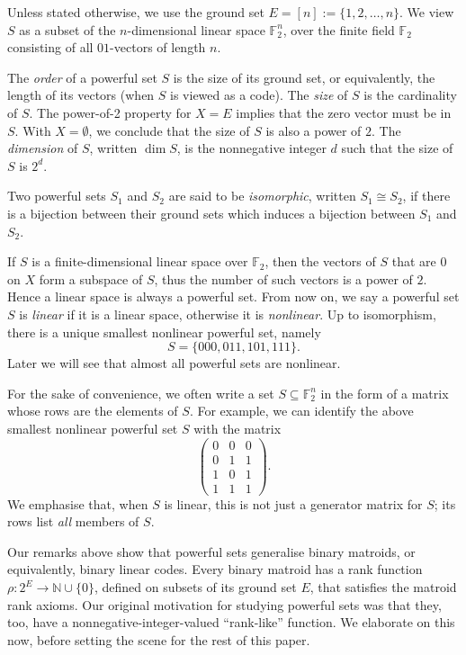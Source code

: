 \documentclass[12pt]{article}
\begin{document}
Unless stated otherwise, we use the ground set $E=[n]:=\{1,2,\ldots,n\}$.  We view $S$ as
a subset of the $n$-dimensional linear space $\mathbb{F}_2^n$, over the finite field
$\mathbb{F}_2$ consisting of all $01$-vectors of length $n$.

The \emph{order} of a powerful set $S$ is the size of its ground set, or equivalently, the
length of its vectors (when $S$ is viewed as a code).
The \emph{size} of $S$ is the cardinality of $S$.
The power-of-2 property for $X=E$ implies that the zero vector must be in $S$.
With $X=\emptyset$, we conclude that the size of $S$ is also a power of $2$.
The \emph{dimension} of $S$, written $\dim S$, is the nonnegative integer $d$ such that the size of $S$ is $2^d$.

Two powerful sets $S_1$ and $S_2$
are said to be \emph{isomorphic}, written $S_1\cong S_2$,
if there is a bijection between their
ground sets which induces a bijection between $S_1$ and $S_2$.

If $S$ is a finite-dimensional linear space over $\mathbb{F}_2$, then the vectors of $S$ that are 0 on $X$ form a subspace of $S$, thus the number of such vectors is a power of $2$.  Hence a linear space is always a powerful set.  From now on, we say a powerful set $S$ is \emph{linear} if it is a linear space, otherwise it is \emph{nonlinear}.  Up to isomorphism, there is a unique
smallest nonlinear powerful set, namely
\[
S=\{000, 011, 101, 111\}.
\]
Later we will see that almost all powerful sets are nonlinear.

For the sake of convenience, we often write a set $S\subseteq\mathbb{F}_2^n$ in the form
of a matrix whose rows are the elements of $S$.
For example, we can identify the above smallest nonlinear powerful set $S$ with the matrix
\begin{equation*}
\left(
\begin{array}{ccc}
0 &0 &0\\
0 &1 &1\\
1 &0 &1\\
1 &1 &1
\end{array}
\right).
\end{equation*}
We emphasise that, when $S$ is linear, this is not just a generator matrix for $S$; its
rows list \textit{all} members of $S$.

Our remarks above show that powerful sets generalise binary matroids, or equivalently,
binary linear codes.  Every binary matroid has a rank function $\rho:2^E\rightarrow\mathbb{N}\cup\{0\}$, defined on subsets of its ground set $E$, that satisfies the matroid rank
axioms.  Our original motivation for studying powerful sets was that they, too, have a
nonnegative-integer-valued ``rank-like'' function.  We elaborate on this now, before
setting the scene for the rest of this paper.
\end{document}
